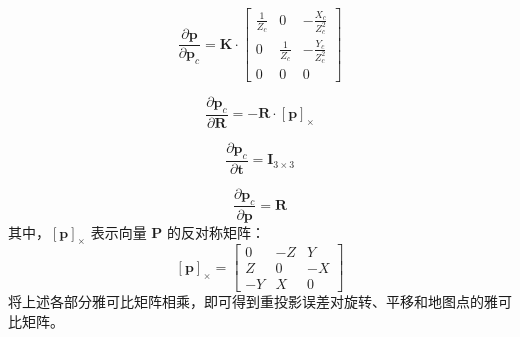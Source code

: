\begin{equation}
\frac{\partial \mathbf{p}}{\partial \mathbf{p}_c} = \mathbf{K} \cdot \begin{bmatrix}
\frac{1}{Z_c} & 0 & -\frac{X_c}{Z_c^2} \\
0 & \frac{1}{Z_c} & -\frac{Y_c}{Z_c^2} \\
0 & 0 & 0
\end{bmatrix}
\end{equation}

\begin{equation}
\frac{\partial \mathbf{p}_c}{\partial \mathbf{R}} = -\mathbf{R} \cdot \left[ \mathbf{p} \right]_\times
\end{equation}

\begin{equation}
\frac{\partial \mathbf{p}_c}{\partial \mathbf{t}} = \mathbf{I}_{3 \times 3}
\end{equation}

\begin{equation}
\frac{\partial \mathbf{p}_c}{\partial \mathbf{p}} = \mathbf{R}
\end{equation}
其中，\( \left[ \mathbf{p} \right]_\times \) 表示向量 \( \mathbf{P} \) 的反对称矩阵：
\begin{equation}
\left[ \mathbf{p} \right]_\times = \begin{bmatrix}
0 & -Z & Y \\
Z & 0 & -X \\
-Y & X & 0
\end{bmatrix}
\end{equation}
将上述各部分雅可比矩阵相乘，即可得到重投影误差对旋转、平移和地图点的雅可比矩阵。

